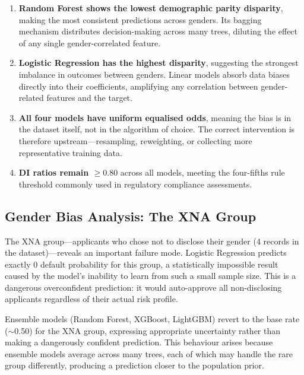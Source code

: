 \begin{enumerate}
    \item \textbf{Random Forest shows the lowest demographic parity disparity}, making the most consistent predictions across genders. Its bagging mechanism distributes decision-making across many trees, diluting the effect of any single gender-correlated feature.
    \item \textbf{Logistic Regression has the highest disparity}, suggesting the strongest imbalance in outcomes between genders. Linear models absorb data biases directly into their coefficients, amplifying any correlation between gender-related features and the target.
    \item \textbf{All four models have uniform equalised odds}, meaning the bias is in the dataset itself, not in the algorithm of choice. The correct intervention is therefore upstream---resampling, reweighting, or collecting more representative training data.
    \item \textbf{\ac{DI} ratios remain $\geq 0.80$} across all models, meeting the four-fifths rule threshold commonly used in regulatory compliance assessments.
\end{enumerate}

\subsection{Gender Bias Analysis: The XNA Group}



The XNA group---applicants who chose not to disclose their gender (4 records in the dataset)---reveals an important failure mode. Logistic Regression predicts exactly 0 default probability for this group, a statistically impossible result caused by the model's inability to learn from such a small sample size. This is a dangerous overconfident prediction: it would auto-approve all non-disclosing applicants regardless of their actual risk profile.

Ensemble models (Random Forest, XGBoost, LightGBM) revert to the base rate ($\sim$0.50) for the XNA group, expressing appropriate uncertainty rather than making a dangerously confident prediction. This behaviour arises because ensemble models average across many trees, each of which may handle the rare group differently, producing a prediction closer to the population prior.

